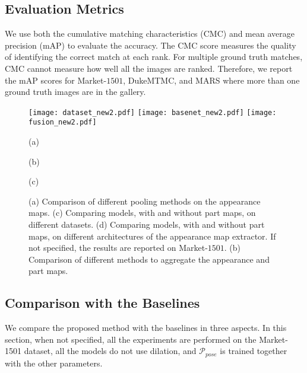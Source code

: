 \documentclass{llncs}
\begin{document}
\subsection{Evaluation Metrics}
We use both the cumulative matching characteristics (CMC) and mean average precision
(mAP) to evaluate the accuracy.
The CMC score measures the quality of identifying the correct match at each rank.
For multiple ground truth matches, CMC cannot measure how well all the images are ranked.
Therefore, we report the mAP scores for Market-$1501$, DukeMTMC, and MARS
where more than one ground truth images are in the gallery.


\begin{figure} [t]
\centering

\small
\texttt{[image: dataset\_new2.pdf]}
\texttt{[image: basenet\_new2.pdf]}
\texttt{[image: fusion\_new2.pdf]}

    \begin{minipage}{0.32\linewidth}
\centering
      \small{(a)}
    \end{minipage}
    \begin{minipage}{0.32\linewidth}
\centering
      \small{(b)}
    \end{minipage}
    \begin{minipage}{0.32\linewidth}
\centering
      \small{(c)}
    \end{minipage}
\vspace{-.3cm}
\caption{
(a) Comparison of different pooling methods on the appearance maps. (c) Comparing models, with and without part maps, on different datasets. (d) Comparing models, with and without part maps, on different architectures of the appearance map extractor. If not specified, the results are reported on Market-$1501$. (b) Comparison of different methods to aggregate the appearance and part maps.
}
\label{fig:baseline}
\vspace{-.5cm}
\end{figure}

\subsection{Comparison with the Baselines}
\label{section:comparison_with_baselines}
We compare the proposed method with the baselines in three aspects. In this section, when not specified, all the experiments are performed on the Market-1501 dataset, all the models do not use dilation, and $\mathcal{P}_{pose}$ is trained together with the other parameters.
\end{document}

